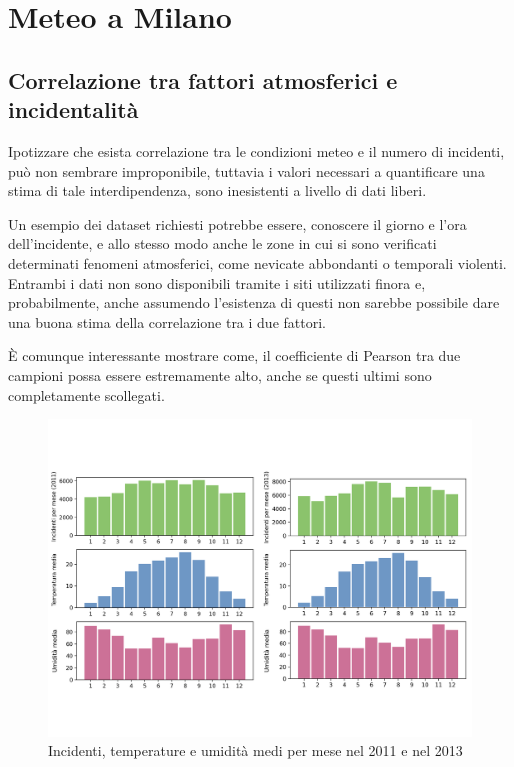 \documentclass[a4paper]{report}
\begin{document}
\section{Meteo a Milano}

\subsection{Correlazione tra fattori atmosferici e incidentalità}

Ipotizzare che esista correlazione tra le condizioni meteo e il numero di incidenti, 
può non sembrare improponibile, tuttavia i valori necessari a quantificare una stima
di tale interdipendenza, sono inesistenti a livello di dati liberi.

Un esempio dei dataset richiesti potrebbe essere, conoscere il giorno e l'ora 
dell'incidente, e allo stesso modo anche le zone in cui si sono verificati determinati 
fenomeni atmosferici, come nevicate abbondanti o temporali violenti. 
Entrambi i dati non sono disponibili tramite i siti utilizzati finora e, 
probabilmente, anche assumendo l'esistenza di questi non sarebbe possibile dare una 
buona stima della correlazione tra i due fattori. 

\`E comunque interessante mostrare come, il coefficiente di Pearson tra due campioni 
possa essere estremamente alto, anche se questi ultimi sono completamente scollegati. 

\begin{figure}
    \includegraphics[width=\linewidth]{img_unite/temp_incidenti.png}
    \caption{Incidenti, temperature e umidità medi per mese nel 2011 e nel 2013}
    \label{fig:incidenti-temp}
\end{figure}
\end{document}
